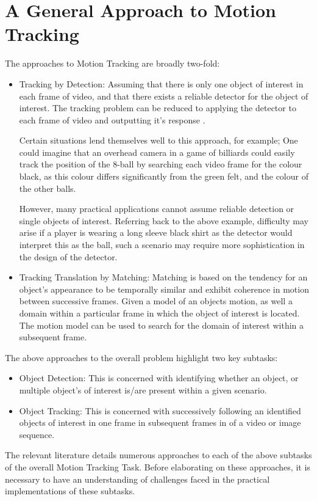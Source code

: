 \section{A General Approach to Motion Tracking}\label{literature_review_general_approach}
The approaches to Motion Tracking are broadly two-fold:
\begin{itemize}
    \item Tracking by Detection:
        Assuming that there is only one object of interest in each frame of
        video, and that there exists a reliable detector for the object of
        interest. The tracking problem can be reduced to applying the detector
        to each frame of video and outputting it's response \cite{Forsyth2012}.

        Certain situations lend themselves well to this approach, for example;
        One could imagine that an overhead camera in a game of billiards could
        easily track the position of the 8-ball by searching each video frame
        for the colour black, as this colour differs significantly from the
        green felt, and the colour of the other balls.
        
        However, many practical applications cannot assume reliable detection or
        single objects of interest. Referring back to the above example,
        difficulty may arise if a player is wearing a long sleeve black shirt as
        the detector would interpret this as the ball, such a scenario may
        require more sophistication in the design of the detector.

    \item Tracking Translation by Matching:
        Matching is based on the tendency for an object's appearance to be
        temporally similar and exhibit coherence in motion between successive
        frames.
        Given a model of an objects motion, as well a domain within a particular
        frame in which the object of interest is located. The motion model can
        be used to search for the domain of interest within a subsequent frame.
        \cite{Forsyth2012}
\end{itemize}   

The above approaches to the overall problem highlight two key subtasks:
    \begin{itemize}
        \item Object Detection: This is concerned with identifying whether an
            object, or multiple object's of interest is/are present within a
            given scenario.
        \item Object Tracking: This is concerned with successively following an
            identified objects of interest in one frame in subsequent frames in
            of a video or image sequence.  
    \end{itemize}
The relevant literature details numerous approaches to each of the above
subtasks of the overall Motion Tracking Task. Before elaborating on these
approaches, it is necessary to have an understanding of challenges faced in
the practical implementations of these subtasks.

